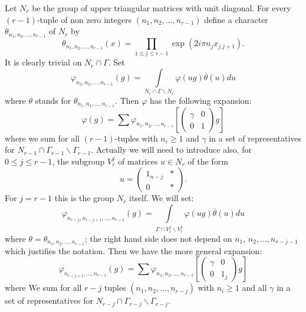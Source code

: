 Let $N_{r}$ be the group of upper triangular matrices with unit diagonal. For every $(r-1)$-tuple of non zero integers $(n_{1},n_{2},\ldots,n_{r-1})$ define a character $\theta_{n_{1},n_{2},\ldots,n_{r-1}}$ of $N_{r}$ by
\begin{equation*}
\theta_{n_{1},n_{2},\ldots,n_{r-1}}(x)=\prod\limits_{1\leq j\leq r-1}\exp (2i\pi n_{j}x_{j.j+1}).\tag{3.1}\label{art5-eq3.1}
\end{equation*}
It is clearly trivial on $N_{r}\cap \Gamma$. Set
\begin{equation*}
\varphi_{n_{2},n_{2},\ldots,n_{r-1}}(g)=\int\limits_{N_{r}\cap \Gamma\backslash N_{r}}\varphi(ug)\overline{\theta}(u)du\tag{3.2}\label{art5-eq3.2}
\end{equation*}
where $\theta$ stands for $\theta_{n_{1},n_{1},\ldots,n_{r-1}}$. Then $\varphi$ has the following expansion:
\begin{equation*}
\varphi(g)=\sum \varphi_{n_{1},n_{2},\ldots,n_{r-1}}\left[\left(\begin{matrix} \gamma & 0\\ 0 & 1\end{matrix}\right)g\right]\tag{3.3}\label{art5-eq3.3}
\end{equation*}
where we sum for all $(r-1)$-tuples with $n_{i}\geq 1$ and $\gamma$ in a set of representatives for $N_{r-1}\cap \Gamma_{r-1}\backslash \Gamma_{r-1}$. Actually we will need to introduce also, for $0\leq j\leq r-1$, the subgroup $V^{j}_{r}$ of matrices $u\in N_{r}$ of the form
$$
u=\left(\begin{matrix} 1_{n-j} & *\\
0 & *
\end{matrix}
\right).
$$
For $j=r-1$ this is the group $N_{r}$ itself. We will set:
$$
\varphi_{n_{r-j},n_{r-j+1},\ldots,n_{r-1}}(g)=\int\limits_{\Gamma\cap V^{j}_{r}\backslash V^{j}_{r}}\varphi(ug)\overline{\theta}(u)du
$$
where $\theta=\theta_{n_{1},n_{2},\ldots,n_{r-1}}$; the right hand side does not depend on $n_{1}$, $n_{2},\ldots,n_{r-j-1}$ which justifies the notation. Then we have the more general expansion:
\begin{equation*}
\varphi_{n_{r-j+1},\ldots,n_{r-1}}(g)=\sum \varphi_{n_{1},n_{2},\ldots,n_{r-1}}\left[\left(\begin{matrix} \gamma & 0\\ 0 & 1_{j}\end{matrix}\right)g\right]\tag{3.4}\label{art5-eq3.4}
\end{equation*}
where We sum for all $r-j$ tuples $(n_{1},n_{2},\ldots,n_{r-j})$ with $n_{i}\geq 1$ and all $\gamma$ in a set of representatives for $N_{r-j}\cap \Gamma_{r-j}\backslash \Gamma_{r-j}$.


